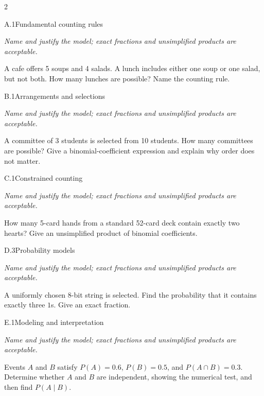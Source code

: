 \documentclass[9pt]{extarticle}
\begin{document}
\CoreWorkArea
\FormBreak
{}
\begin{multicols}{2}
\begin{CoreProblem}{A.1}{Fundamental counting rules}
{\scriptsize\textit{Name and justify the model; exact fractions and unsimplified products are acceptable.}\par}
A cafe offers 5 soups and 4 salads. A lunch includes either one soup
    or one salad, but not both. How many lunches are possible? Name the counting
    rule.
\end{CoreProblem}
\begin{CoreProblem}{B.1}{Arrangements and selections}
{\scriptsize\textit{Name and justify the model; exact fractions and unsimplified products are acceptable.}\par}
A committee of 3 students is selected from 10 students. How many
    committees are possible? Give a binomial-coefficient expression and explain
    why order does not matter.
\end{CoreProblem}
\begin{CoreProblem}{C.1}{Constrained counting}
{\scriptsize\textit{Name and justify the model; exact fractions and unsimplified products are acceptable.}\par}
How many 5-card hands from a standard 52-card deck contain exactly
    two hearts? Give an unsimplified product of binomial coefficients.
\end{CoreProblem}
\columnbreak
\begin{CoreProblem}{D.3}{Probability models}
{\scriptsize\textit{Name and justify the model; exact fractions and unsimplified products are acceptable.}\par}
A uniformly chosen 8-bit string is selected. Find the probability
    that it contains exactly three $1$s. Give an exact fraction.
\end{CoreProblem}
\begin{CoreProblem}{E.1}{Modeling and interpretation}
{\scriptsize\textit{Name and justify the model; exact fractions and unsimplified products are acceptable.}\par}
Events $A$ and $B$ satisfy $P(A)=0.6$, $P(B)=0.5$, and
    $P(A\cap B)=0.3$. Determine whether $A$ and $B$ are independent, showing
    the numerical test, and then find $P(A\mid B)$.
\end{CoreProblem}
\end{multicols}
\CoreWorkArea
\FormBreak
{}
\end{document}
